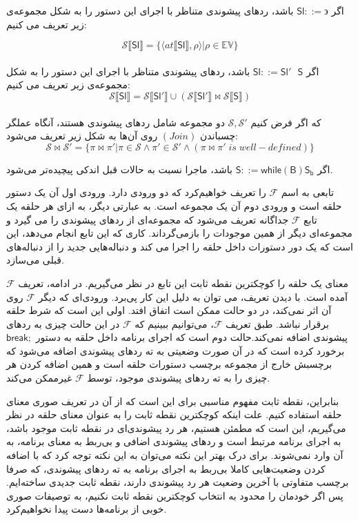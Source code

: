 \begin{defn}
	
	اگر 
	$         \mathsf{Sl} ::= \backepsilon  $
	باشد، ردهای پیشوندی متناظر با اجرای این دستور را به شکل مجموعه‌ی زیر تعریف می کنیم:
	
	$$\mathcal{S} \llbracket\mathsf{Sl}\rrbracket = \{ \langle at\llbracket\mathsf{Sl}\rrbracket , \rho \rangle | \rho \in \mathbb{EV}       \}        $$ \\
	
	اگر $         \mathsf{Sl} ::= \mathsf{Sl' \:\:\: S}  $ باشد، ردهای پیشوندی متناظر با اجرای این دستور را به شکل مجموعه‌ی زیر تعریف می کنیم:
	$$\mathcal{S} \llbracket\mathsf{Sl}\rrbracket = \mathcal{S} \llbracket\mathsf{Sl'}\rrbracket \cup( \mathcal{S} \llbracket\mathsf{Sl'}\rrbracket
	\Join \mathcal{S} \llbracket\mathsf{S}\rrbracket )      $$ \\
	که اگر فرض کنیم 
	$\mathcal{S,S'}$
	دو مجموعه شامل ردهای پیشوندی هستند، آنگاه عملگر چسباندن 
	$(Join)$
	روی آن‌ها به شکل زیر تعریف می‌شود:
	$$\mathcal{S}\Join \mathcal{S}' = \{\pi \Join \pi' | \pi \in \mathcal{S}\land\pi' \in \mathcal{S}'\land (\pi \Join \pi'\;is\; well-defined) \}$$
	
	
	اگر $         \mathsf{S} ::= \mathsf{while (B)S_b }   $ باشد، ماجرا نسبت به حالات قبل اندکی پیچیده‌تر می‌شود.
	
	تابعی به اسم $\mathcal{F} $ را تعریف خواهیم‌کرد که دو ورودی دارد. ورودی اول آن یک دستور حلقه است و ورودی دوم آن یک مجموعه است. به عبارتی دیگر، به ازای هر حلقه یک تابع $\mathcal{F} $  جداگانه تعریف می‌شود که مجموعه‌ای از ردهای پیشوندی را می گیرد و مجموعه‌ای دیگر از همین موجودات را بازمی‌گرداند. کاری که این تابع انجام می‌دهد، این است که یک دور دستورات داخل حلقه را اجرا می کند و دنباله‌هایی جدید را از دنباله‌های قبلی می‌سازد. 
	
	معنای یک حلقه را کوچکترین نقطه ثابت این تابع در نظر می‌گیریم. در ادامه، تعریف $\mathcal{F} $ آمده است. با دیدن تعریف، می توان به دلیل این کار پی‌برد. ورودی‌ای که دیگر $\mathcal{F} $ روی آن اثر نمی‌کند، در دو حالت ممکن است اتفاق افتد. اولی این است که شرط حلقه برقرار نباشد. طبق تعریف $\mathcal{F} $،  می‌توانیم ببینیم که $\mathcal{F} $  در این حالت چیزی به ردهای پیشوندی اضافه نمی‌کند.حالت دوم است که اجرای برنامه داخل حلقه به دستور $\mathsf{break;}$ برخورد کرده است که در آن صورت وضعیتی به ته ردهای پیشوندی اضافه می‌شود که برچسبش خارج از مجموعه برچسب دستورات حلقه است و همین اضافه کردن هر چیزی را به ته ردهای پیشوندی موجود، توسط $\mathcal{F} $  غیرممکن می‌کند. 
	
	بنابراین، نقطه ثابت مفهوم مناسبی برای این است که از آن در تعریف صوری معنای حلقه استفاده کنیم. علت اینکه کوچکترین نقطه ثابت را به عنوان معنای حلقه در نظر می‌گیریم، این است که مطمئن هستیم، هر رد پیشوندی‌ای در نقطه ثابت موجود باشد، به اجرای برنامه مرتبط است و ردهای پیشوندی اضافی و بی‌ربط به معنای برنامه، به آن وارد نمی‌شوند. برای درک بهتر این نکته می‌توان به این نکته توجه کرد که با اضافه کردن وضعیت‌هایی کاملا بی‌ربط به اجرای برنامه به ته رد‌های پیشوندی، که صرفا برچسب متفاوتی با آخرین وضعیت هر رد پیشوندی دارند، نقطه ثابت جدیدی ساخته‌ایم. پس اگر خودمان را محدود به انتخاب کوچکترین نقطه ثابت نکنیم، به توصیفات صوری خوبی از برنامه‌ها دست پیدا نخواهیم‌کرد. 
	

\end{defn}
